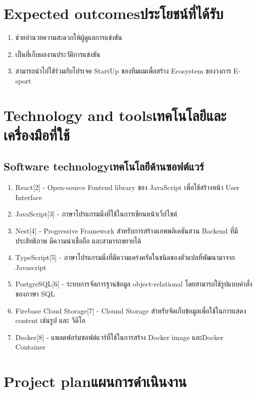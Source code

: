 \section{\ifenglish Expected outcomes\else ประโยชน์ที่ได้รับ\fi}
\begin{enumerate}
    \item ช่วยอำนวยความสะดวกให้ผู้ดูแลการแข่งขัน
    \item เป็นที่เก็บผลงานประวัติการแข่งขัน
    \item สามารถนำไปใช้ร่วมกับโปรเจค StartUp ของทีมผมเพื่อสร้าง Ecosystem ของวงการ E-sport
\end{enumerate}

\section{\ifenglish Technology and tools\else เทคโนโลยีและเครื่องมือที่ใช้\fi}

\subsection{\ifenglish Software technology\else เทคโนโลยีด้านซอฟต์แวร์\fi}
\begin{enumerate}
    \item React[2] - Open-source Fontend library ของ JavaScript เพื่อใช้สร้างหน้า User Interface
    \item JavaScript[3] - ภาษาโปรแกรมมิ่งที่ใช้ในการเขียนหน้าเว็ปไซต์
    \item Nest[4] - Progressive Framework สำหรับการสร้างแอพพลิเคชันสวน Backend ที่มีประสิทธิภาพ มีความน่าเชื่อถือ และสามารถขยายได้
    \item TypeScript[5] - ภาษาโปรแกรมมิ่งที่มีความเคร่งครัดในชนิดของตัวแปลที่พัฒนามาจาก Javascript
    \item PostgreSQL[6] - ระบบการจัดการฐานข้อมูล object-relational โดยสามารถใช้รูปแบบคำสั่งของภาษา SQL
    \item Firebase Cloud Storage[7] - Clound Storage สำหรับจัดเก็บข้อมูลเพื่อใช้ในการแสดง content เช่นรูป และ วีดีโอ
    \item Docker[8] - แพลตฟอร์มซอฟต์แวร์ที่ใช้ในการสร้าง Docker image และDocker Container 
\end{enumerate}

\section{\ifenglish Project plan\else แผนการดำเนินงาน\fi}

